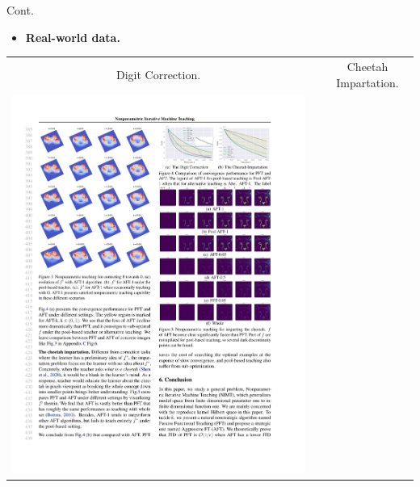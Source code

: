 \documentclass[aspectratio=169,xcolor=dvipsnames]{beamer}
\begin{document}
\begin{frame}{Cont.}
\begin{itemize}
    \item {\bf  Real-world data.}
\end{itemize}

\centering
\begin{tabular}{ccc}

{\scriptsize \color{blue} Digit Correction.} & & {\scriptsize \color{blue} Cheetah Impartation.}\vspace{-0.8mm}\\

\includegraphics[scale=0.7]{./out/realworld/digit} & 


\end{tabular}
\end{frame}
\end{document}
